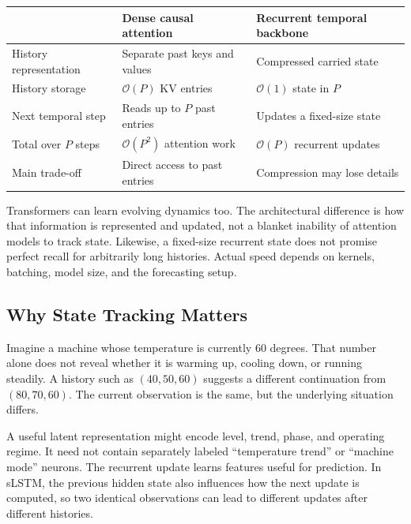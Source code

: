 \documentclass[11pt, oneside]{book}
\newcommand{\bigO}[1]{\mathcal{O}\!\left(#1\right)}
\let\originalsubsection\subsection
\renewcommand{\subsection}{\Needspace{6\baselineskip}\originalsubsection}
\begin{document}
\begin{center}
\small\renewcommand{\arraystretch}{1.18}
\begin{tabular}{@{}>{\raggedright\arraybackslash}p{3.4cm}>{\raggedright\arraybackslash}p{5.7cm}>{\raggedright\arraybackslash}p{6.0cm}@{}}
\toprule
 & \textbf{Dense causal attention} & \textbf{Recurrent temporal backbone}\\
\midrule
History representation & Separate past keys and values & Compressed carried state\\
History storage & $\bigO{P}$ KV entries & $\bigO{1}$ state in $P$\\
Next temporal step & Reads up to $P$ past entries & Updates a fixed-size state\\
Total over $P$ steps & $\bigO{P^2}$ attention work & $\bigO{P}$ recurrent updates\\
Main trade-off & Direct access to past entries & Compression may lose details\\
\bottomrule
\end{tabular}
\end{center}

Transformers can learn evolving dynamics too. The architectural difference is how that information is represented and updated, not a blanket inability of attention models to track state. Likewise, a fixed-size recurrent state does not promise perfect recall for arbitrarily long histories. Actual speed depends on kernels, batching, model size, and the forecasting setup.

\subsection{Why State Tracking Matters}\label{sec:source-9-1-7}
Imagine a machine whose temperature is currently $60$ degrees. That number alone does not reveal whether it is warming up, cooling down, or running steadily. A history such as $(40,50,60)$ suggests a different continuation from $(80,70,60)$. The current observation is the same, but the underlying situation differs.

A useful latent representation might encode level, trend, phase, and operating regime. It need not contain separately labeled ``temperature trend'' or ``machine mode'' neurons. The recurrent update learns features useful for prediction. In sLSTM, the previous hidden state also influences how the next update is computed, so two identical observations can lead to different updates after different histories.
\end{document}
